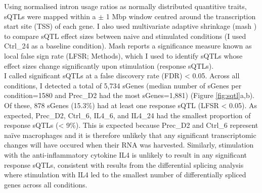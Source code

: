Using normalised intron usage ratios as normally distributed quantitive traits, sQTLs were mapped within a $\pm$ 1 Mbp window centred around the transcription start site (TSS) of each gene. I also used multivariate adaptive shrinkage (mash \cite{Urbut2019-gf}) to compare sQTL effect sizes between naive and stimulated conditions (I used Ctrl\_24 as a baseline condition). Mash reports a significance measure known as local false sign rate (LFSR; Methods), which I used to identify sQTLs whose effect sizes change significantly upon stimulation (response sQTLs). \\

I called significant sQTLs at a false discovery rate (FDR) < 0.05. Across all conditions, I detected a total of 5,734 sGenes (median number of sGenes per condition=1580 and Prec\_D2 had the most sGenes=1,881) (Figure \ref{fig:sqtl}a,b). Of these, 878 sGenes (15.3\%) had at least one response sQTL (LFSR < 0.05).  As expected, Prec\_D2, Ctrl\_6, IL4\_6, and IL4\_24 had the smallest proportion of response sQTLs (< 9\%). This is expected because Prec\_D2 and Ctrl\_6 represent naïve macrophages and it is therefore unlikely that any significant transcriptomic changes will have occured when their RNA was harvested. Similarly, stimulation with the anti-inflammatory cytokine IL4 is unlikely to result in any significant response sQTLs, consistent with results from the differential splicing analysis where stimulation with IL4 led to the smallest number of differentially spliced genes across all conditions.\\

